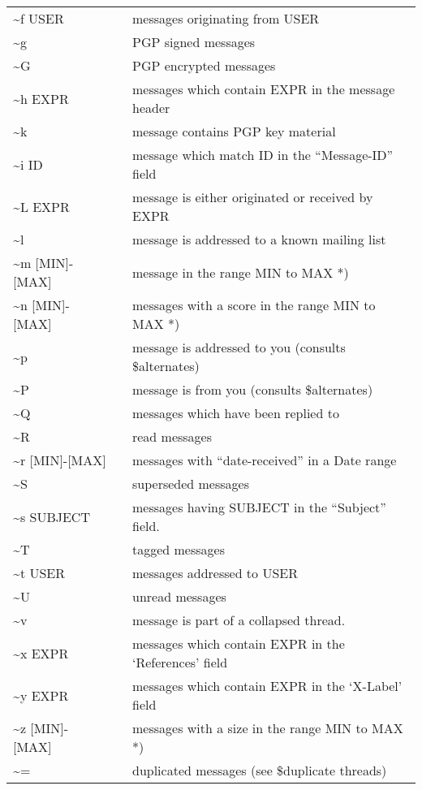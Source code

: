 \documentclass{article}
\begin{document}
\begin{table*}[!b]
\begin{tabulary}{\textwidth}{LLL}
  \textasciitilde{}f USER & & messages originating from USER\\
  \textasciitilde{}g & & PGP signed messages\\
  \textasciitilde{}G & & PGP encrypted messages\\
  \textasciitilde{}h EXPR & & messages which contain EXPR in the message header\\
  \textasciitilde{}k & & message contains PGP key material\\
  \textasciitilde{}i ID & & message which match ID in the ``Message-ID''
  field\\
  \textasciitilde{}L EXPR & & message is either originated or received by EXPR\\
  \textasciitilde{}l & & message is addressed to a known mailing list\\
  \textasciitilde{}m [MIN]-[MAX] & & message in the range MIN to MAX *)\\
  \textasciitilde{}n [MIN]-[MAX] & & messages with a score in the range MIN to MAX *)\\
  \textasciitilde{}p & & message is addressed to you (consults \$alternates)\\
  \textasciitilde{}P & & message is from you (consults \$alternates)\\
  \textasciitilde{}Q & & messages which have been replied to\\
  \textasciitilde{}R & & read messages\\
  \textasciitilde{}r [MIN]-[MAX] & & messages with ``date-received'' in a Date range\\
  \textasciitilde{}S & & superseded messages\\
  \textasciitilde{}s SUBJECT & & messages having SUBJECT in the ``Subject'' field.\\
  \textasciitilde{}T & & tagged messages\\
  \textasciitilde{}t USER & & messages addressed to USER\\
  \textasciitilde{}U & & unread messages\\
  \textasciitilde{}v & & message is part of a collapsed thread.\\
  \textasciitilde{}x EXPR & & messages which contain EXPR in the `References' field\\
  \textasciitilde{}y EXPR & & messages which contain EXPR in the `X-Label' field\\
  \textasciitilde{}z [MIN]-[MAX] & & messages with a size in the range MIN to MAX *)\\
  \textasciitilde{}= & & duplicated messages (see \$duplicate threads)\\
\end{tabulary}
\end{table*}
\end{document}
